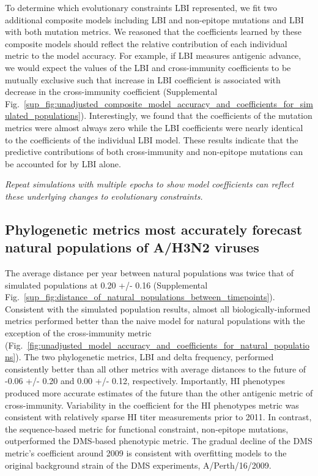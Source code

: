 To determine which evolutionary constraints LBI represented, we fit two additional composite models including LBI and non-epitope mutations and LBI with both mutation metrics.
We reasoned that the coefficients learned by these composite models should reflect the relative contribution of each individual metric to the model accuracy.
For example, if LBI measures antigenic advance, we would expect the values of the LBI and cross-immunity coefficients to be mutually exclusive such that increase in LBI coefficient is associated with decrease in the cross-immunity coefficient (Supplemental Fig.~\ref{sup_fig:unadjusted_composite_model_accuracy_and_coefficients_for_simulated_populations}).
Interestingly, we found that the coefficients of the mutation metrics were almost always zero while the LBI coefficients were nearly identical to the coefficients of the individual LBI model.
These results indicate that the predictive contributions of both cross-immunity and non-epitope mutations can be accounted for by LBI alone.

\textit{Repeat simulations with multiple epochs to show model coefficients can reflect these underlying changes to evolutionary constraints.}

\subsection*{Phylogenetic metrics most accurately forecast natural populations of A/H3N2 viruses}

The average distance per year between natural populations was twice that of simulated populations at 0.20 +/- 0.16 (Supplemental Fig.~\ref{sup_fig:distance_of_natural_populations_between_timepoints}).
Consistent with the simulated population results, almost all biologically-informed metrics performed better than the naive model for natural populations with the exception of the cross-immunity metric (Fig.~\ref{fig:unadjusted_model_accuracy_and_coefficients_for_natural_populations}).
The two phylogenetic metrics, LBI and delta frequency, performed consistently better than all other metrics with average distances to the future of -0.06 +/- 0.20 and 0.00 +/- 0.12, respectively.
Importantly, HI phenotypes produced more accurate estimates of the future than the other antigenic metric of cross-immunity.
Variability in the coefficient for the HI phenotypes metric was consistent with relatively sparse HI titer measurements prior to 2011.
In contrast, the sequence-based metric for functional constraint, non-epitope mutations, outperformed the DMS-based phenotypic metric.
The gradual decline of the DMS metric's coefficient around 2009 is consistent with overfitting models to the original background strain of the DMS experiments, A/Perth/16/2009.

